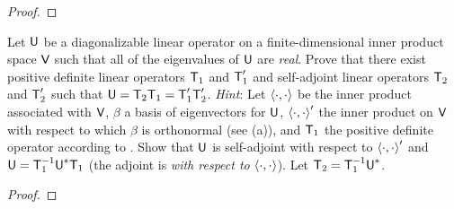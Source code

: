 \begin{proof}
\end{proof}

\begin{exercise} \label{exercise 6.4.23}
Let \(\textsf{U}\) be a diagonalizable linear operator on a finite-dimensional inner product space \(\textsf{V}\) such that all of the eigenvalues of \(\textsf{U}\) are \emph{real}.
Prove that there exist positive definite linear operators \(\textsf{T}_1\) and \(\textsf{T}_1'\) and self-adjoint linear operators \(\textsf{T}_2\) and \(\textsf{T}_2'\) such that \(\textsf{U} = \textsf{T}_2 \textsf{T}_1 = \textsf{T}_1' \textsf{T}_2'\).
\emph{Hint}: Let \(\left< \cdot, \cdot \right>\) be the inner product associated with \(\textsf{V}\), \(\beta\) a basis of eigenvectors for \(\textsf{U}\), \(\left< \cdot, \cdot \right>'\) the inner product on \(\textsf{V}\) with respect to which \(\beta\) is orthonormal (see (a)), and \(\textsf{T}_1\) the positive definite operator according to .
Show that \(\textsf{U}\) is self-adjoint with respect to \(\left< \cdot, \cdot \right>'\) and \(\textsf{U} = \textsf{T}_1^{-1} \textsf{U}^* \textsf{T}_1\) (the adjoint is \emph{with respect to} \(\left< \cdot, \cdot \right>\)).
Let \(\textsf{T}_2 = \textsf{T}_1^{-1} \textsf{U}^*\).
\end{exercise}

\begin{proof}
\end{proof}
